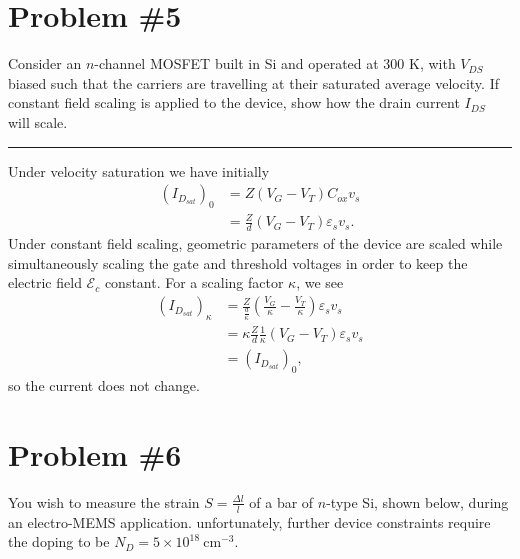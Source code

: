 \documentclass{article}
\newcommand{\horline}
           {\begin{center}
              \noindent\rule{8cm}{0.4pt}
            \end{center}}
\begin{document}
\section*{Problem \#5}
Consider an $n$-channel MOSFET built in Si and operated at 300 K, with 
$V_{DS}$ biased such that the carriers are travelling at their saturated 
average velocity. If constant field scaling is applied to the device, show
how the drain current $I_{DS}$ will scale.
\horline
Under velocity saturation we have initially
\begin{align*}
(I_{D_{sat}})_0 &= Z (V_G - V_T)C_{ox} v_s \\
                &= \frac{Z}{d} (V_G - V_T) \varepsilon_s v_s.
\end{align*}
Under constant field scaling, geometric parameters of the device are scaled
while simultaneously scaling the gate and threshold voltages in order to keep
the electric field $\mathscr{E}_c$ constant. For a scaling factor $\kappa$, we
see
\begin{align*}
(I_{D_{sat}})_{\kappa} &= \frac{Z}{\frac{d}{\kappa}} 
                          \left(\frac{V_G}{\kappa} - \frac{V_T}{\kappa}\right) 
                          \varepsilon_s v_s \\
                       &= \kappa 
                          \frac{Z}{d}
                          \frac{1}{\kappa}\left(V_G - V_T\right) 
                          \varepsilon_s v_s \\
                       &= (I_{D_{sat}})_0,
\end{align*}
so the current does not change.

\pagebreak

\section*{Problem \#6}
You wish to measure the strain $S = \frac{\Delta l}{l}$ of a bar of 
$n$-type Si, shown below, during an electro-MEMS application. unfortunately,
further device constraints require the doping to be 
$N_D = 5 \times 10^{18} ~\mathrm{cm}^{-3}$.
\end{document}
